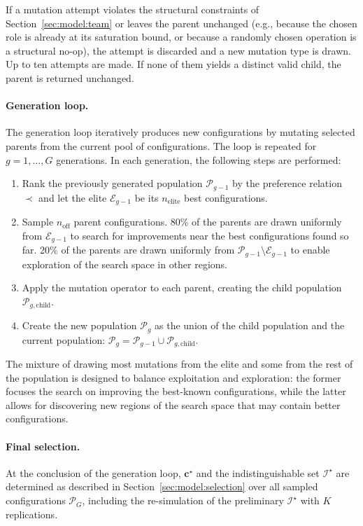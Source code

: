 \documentclass[smallextended]{svjour3}       %
\begin{document}
If a mutation attempt violates the structural constraints of Section~\ref{sec:model:team} or
leaves the parent unchanged (e.g., because the chosen role is already at its
saturation bound, or because a randomly chosen operation
is a structural no-op), the attempt is discarded and a new mutation type is drawn.
Up to ten attempts are made. If none of them yields a distinct valid child, the parent is
returned unchanged.

\paragraph{Generation loop.} The generation loop iteratively produces new configurations by mutating selected parents from the current pool of configurations. The loop is repeated for $g=1,\ldots,G$ generations. In each generation, the following steps are performed:
\begin{enumerate}
  \item Rank the previously generated population $\mathcal{P}_{g-1}$ by the preference relation $\prec$ and let the elite $\mathcal{E}_{g-1}$ be its $n_\mathrm{elite}$ best configurations.
  \item Sample $n_\mathrm{off}$ parent configurations. 80\% of the parents are drawn uniformly from $\mathcal{E}_{g-1}$ to search for improvements near the best configurations found so far. 20\% of the parents are drawn uniformly from $\mathcal{P}_{g-1} \setminus \mathcal{E}_{g-1}$ to enable exploration of the search space in other regions.
  \item Apply the mutation operator to each parent, creating the child population $\mathcal{P}_{g,\mathrm{child}}$.
  \item Create the new population $\mathcal{P}_g$ as the union of the child population and the current population: $\mathcal{P}_g = \mathcal{P}_{g-1} \cup \mathcal{P}_{g,\mathrm{child}}$.
\end{enumerate}

The mixture of drawing most mutations from the elite and some from the rest of the population is designed to balance exploitation and exploration: the former focuses the search on improving the best-known configurations, while the latter allows for discovering new regions of the search space that may contain better configurations.

\paragraph{Final selection.}
At the conclusion of the generation loop, $\mathbf{c}^\star$ and the indistinguishable set $\mathcal{I}^\star$ are determined as described in Section~\ref{sec:model:selection} over all sampled configurations $\mathcal{P}_G$, including the re-simulation of the preliminary $\mathcal{I}^\star$ with $K$ replications.
\end{document}
